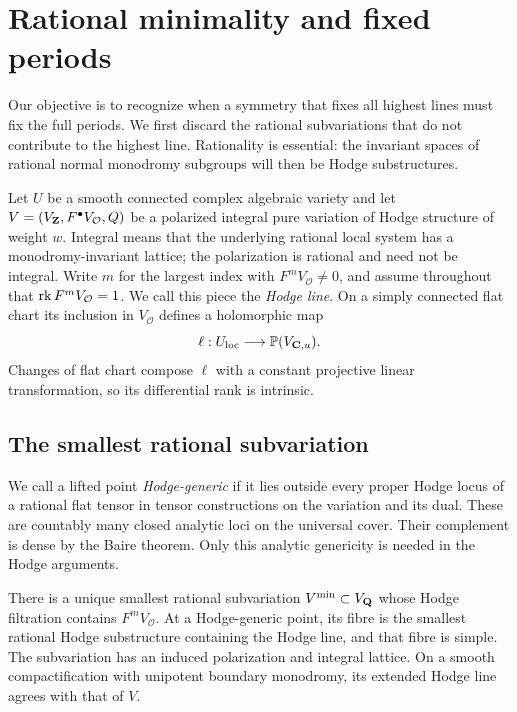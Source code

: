\section{Rational minimality and fixed periods}\label{sec:rational}\label{altord:h:section}
Our objective is to recognize when a symmetry that fixes all highest
lines must fix the full periods. We first discard the rational
subvariations that do not contribute to the highest line. Rationality
is essential: the invariant spaces of rational normal monodromy
subgroups will then be Hodge substructures.

Let $U$ be a smooth connected complex algebraic variety and let
$V=(V_{\mathbf Z},F^\bullet V_{\mathcal O},Q)$ be a polarized integral pure
variation of Hodge structure of weight $w$. Integral means that the
underlying rational local system has a monodromy-invariant lattice;
the polarization is rational and need not be integral. Write $m$ for the largest index with
$F^mV_{\mathcal O}\ne0$, and assume throughout that
$\operatorname{rk} F^mV_{\mathcal O}=1$. We call this piece the \emph{Hodge line}.
On a simply connected flat chart its inclusion in $V_{\mathcal O}$
defines a holomorphic map
\[
 \ell:U_{\mathrm{loc}}\longrightarrow \mathbb P(V_{\mathbf C,u}).
\]
Changes of flat chart compose $\ell$ with a constant projective linear
transformation, so its differential rank is intrinsic.

\subsection{The smallest rational subvariation}

We call a lifted point \emph{Hodge-generic} if it lies outside every
proper Hodge locus of a rational flat tensor in tensor constructions on
the variation and its dual. These are countably many closed analytic
loci on the universal cover. Their complement is dense by the Baire
theorem. Only this analytic genericity is needed in the Hodge arguments.

\begin{lemma}\label{altord:h:minimal}
There is a unique smallest rational subvariation $V^{\min}\subset V_{\mathbf Q}$
whose Hodge filtration contains $F^mV_{\mathcal O}$. At a Hodge-generic
point, its fibre is the smallest rational Hodge substructure containing
the Hodge line, and that fibre is simple. The subvariation has an induced
polarization and integral lattice. On a smooth compactification with
unipotent boundary monodromy, its extended Hodge line agrees with that
of $V$.
\end{lemma}


